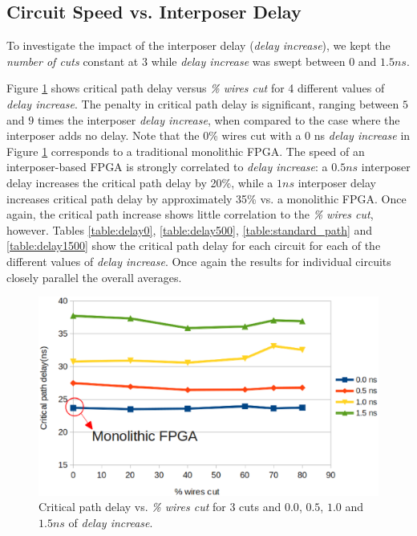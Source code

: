 \documentclass{sig-alternate-2013}
\begin{document}
\subsection{Circuit Speed vs. Interposer Delay}

To investigate the impact of the interposer delay (\textit{delay increase}), we kept the \textit{number of cuts} constant at $3$ while \textit{delay increase} was swept between $0$ and $1.5ns$.

Figure \ref{fig:delays_crit} shows critical path delay versus \textit{\% wires cut} for 4 different values of \textit{delay increase}. The penalty in critical path delay is significant, ranging between $5$ and $9$ times the interposer \textit{delay increase}, when compared to the case where the interposer adds no delay. Note that the 0\% wires cut with a 0 ns \textit{delay increase} in Figure \ref{fig:delays_crit} corresponds to a traditional monolithic FPGA. The speed of an interposer-based FPGA is strongly correlated to \textit{delay increase}: a $0.5ns$ interposer delay increases the critical path delay by 20\%, while a $1ns$ interposer delay increases critical path delay by approximately 35\% vs. a monolithic FPGA. Once again, the critical path increase shows little correlation to the \textit{\% wires cut}, however. Tables \ref{table:delay0}, \ref{table:delay500}, \ref{table:standard_path} and \ref{table:delay1500} show the critical path delay for each circuit for each of the different values of \textit{delay increase}. Once again the results for individual circuits closely parallel the overall averages.

\begin{figure}[!htbp]
\centering
\includegraphics[width=\linewidth]{delays_crit_path.eps}
\caption{Critical path delay vs. \textit{\% wires cut} for 3 cuts and $0.0$, $0.5$, $1.0$ and $1.5ns$ of \textit{delay increase}.}
\label{fig:delays_crit}
\end{figure}
\end{document}

